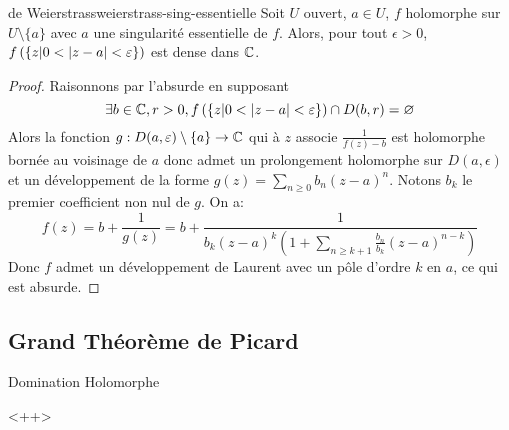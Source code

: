 \documentclass{cours}
\begin{document}
\begin{théorème}
	{de Weierstrass}{weierstrass-sing-essentielle}
	Soit $U$ ouvert, $a \in U$, $f$ holomorphe sur $U \setminus \{a\}$ avec $a$ une singularité essentielle de $f$. 
	Alors, pour tout $\epsilon > 0$, $f\left(\left\{z \middle| 0 < \left|z - a\right| < \varepsilon\right\}\right)$ est dense dans $\mathbb{C}$. 
\end{théorème}
\begin{proof}
	Raisonnons par l'absurde en supposant 
	\begin{equation*}
		\exists b \in \mathbb{C}, r > 0, f\left(\left\{z \middle| 0 < \left|z - a\right| < \varepsilon\right\}\right) \cap D(b, r) = \varnothing
	\end{equation*}
	Alors la fonction $g : D(a, \varepsilon) \setminus \{a\} \to \mathbb{C}$ qui à $z$ associe $\frac{1}{f(z) - b}$ est holomorphe bornée au voisinage de $a$ donc admet un prolongement holomorphe sur $D(a, \epsilon)$ et un développement de la forme $g(z) = \sum_{n \geq 0} b_{n} \left(z - a\right)^{n}$. 
	Notons $b_{k}$ le premier coefficient non nul de $g$. On a: 
	\begin{equation*}
		f(z) = b + \frac{1}{g(z)} = b + \frac{1}{b_{k}(z - a)^{k}\left(1 + \sum_{n \geq k + 1} \frac{b_{n}}{b_{k}}(z - a)^{n-k}\right)}
	\end{equation*}
	Donc $f$ admet un développement de Laurent avec un pôle d'ordre $k$ en $a$, ce qui est absurde.
\end{proof}

\subsection{Grand Théorème de Picard} 
\begin{lemme}
	{Domination Holomorphe}{}
\end{lemme}<++>
\end{document}
